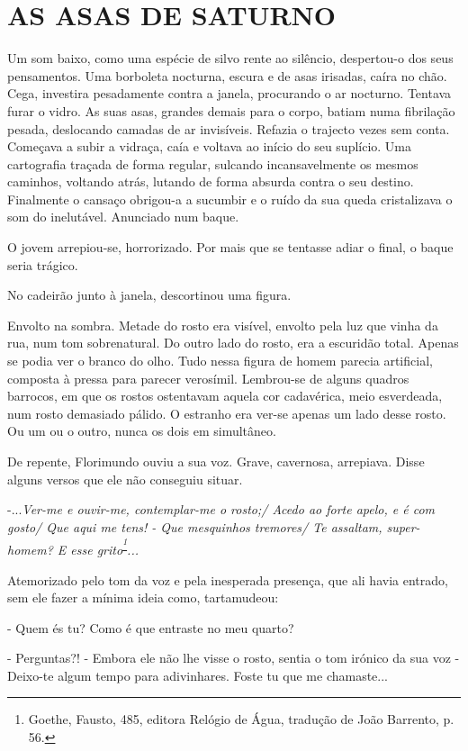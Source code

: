 \section{\textbf{AS ASAS DE
SATURNO}}

Um som baixo, como uma espécie de silvo rente ao silêncio, despertou-o
dos seus pensamentos. Uma borboleta nocturna, escura e de asas irisadas,
caíra no chão. Cega, investira pesadamente contra a janela, procurando o
ar nocturno. Tentava furar o vidro. As suas asas, grandes demais para o
corpo, batiam numa fibrilação pesada, deslocando camadas de ar
invisíveis. Refazia o trajecto vezes sem conta. Começava a subir a
vidraça, caía e voltava ao início do seu suplício. Uma cartografia
traçada de forma regular, sulcando incansavelmente os mesmos caminhos,
voltando atrás, lutando de forma absurda contra o seu destino.
Finalmente o cansaço obrigou-a a sucumbir e o ruído da sua queda
cristalizava o som do inelutável. Anunciado num baque.

O jovem arrepiou-se, horrorizado. Por mais que se tentasse adiar o
final, o baque seria trágico.

No cadeirão junto à janela, descortinou uma figura.

Envolto na sombra. Metade do rosto era visível, envolto pela luz que
vinha da rua, num tom sobrenatural. Do outro lado do rosto, era a
escuridão total. Apenas se podia ver o branco do olho. Tudo nessa figura
de homem parecia artificial, composta à pressa para parecer verosímil.
Lembrou-se de alguns quadros barrocos, em que os rostos ostentavam
aquela cor cadavérica, meio esverdeada, num rosto demasiado pálido. O
estranho era ver-se apenas um lado desse rosto. Ou um ou o outro, nunca
os dois em simultâneo.

De repente, Florimundo ouviu a sua voz. Grave, cavernosa, arrepiava.
Disse alguns versos que ele não conseguiu situar.

-...\emph{Ver-me e ouvir-me, contemplar-me o rosto;/ Acedo ao forte
apelo, e é com gosto/ Que aqui me tens! - Que mesquinhos tremores/ Te
assaltam, super-homem? E esse grito}\textsuperscript{\emph{\footnote{Goethe,
  Fausto, 485, editora Relógio de Água, tradução de João Barrento, p.
  56. }}}\emph{...}

Atemorizado pelo tom da voz e pela inesperada presença, que ali havia
entrado, sem ele fazer a mínima ideia como, tartamudeou:

- Quem és tu? Como é que entraste no meu quarto?

- Perguntas?! - Embora ele não lhe visse o rosto, sentia o tom irónico
da sua voz - Deixo-te algum tempo para adivinhares. Foste tu que me
chamaste...

